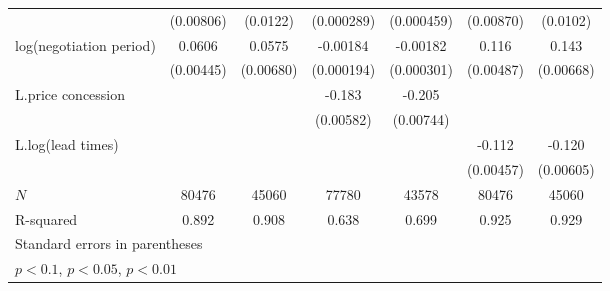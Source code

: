 {\begin{adjustbox}{max width=\textwidth}
\begin{tabular}{l*{6}{c}}
            &   (0.00806)         &    (0.0122)         &  (0.000289)         &  (0.000459)         &   (0.00870)         &    (0.0102)         \\
\addlinespace
log(negotiation period)&      0.0606\sym{***}&      0.0575\sym{***}&    -0.00184\sym{***}&    -0.00182\sym{***}&       0.116\sym{***}&       0.143\sym{***}\\
            &   (0.00445)         &   (0.00680)         &  (0.000194)         &  (0.000301)         &   (0.00487)         &   (0.00668)         \\
\addlinespace
L.price concession&                     &                     &      -0.183\sym{***}&      -0.205\sym{***}&                     &                     \\
            &                     &                     &   (0.00582)         &   (0.00744)         &                     &                     \\
\addlinespace
L.log(lead times)   &                     &                     &                     &                     &      -0.112\sym{***}&      -0.120\sym{***}\\
            &                     &                     &                     &                     &   (0.00457)         &   (0.00605)         \\
\midrule
\(N\)       &       80476         &       45060         &       77780         &       43578         &       80476         &       45060         \\
R-squared   &       0.892         &       0.908         &       0.638         &       0.699         &       0.925         &       0.929         \\
\bottomrule
\multicolumn{7}{l}{\footnotesize Standard errors in parentheses}\\
\multicolumn{7}{l}{\footnotesize \sym{*} \(p<0.1\), \sym{**} \(p<0.05\), \sym{***} \(p<0.01\)}\\
\end{tabular}
\end{adjustbox}
}
